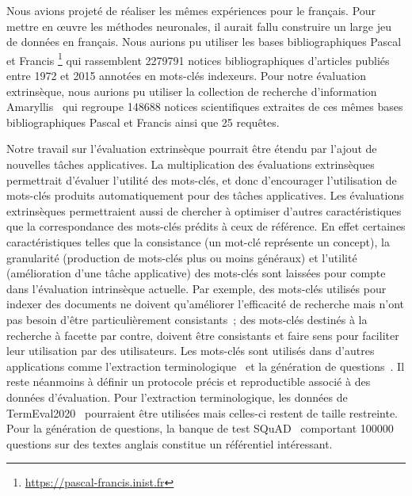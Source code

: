 Nous avions projeté de réaliser les mêmes expériences pour le français. Pour mettre en \oe{}uvre les méthodes neuronales, il aurait fallu construire un large jeu de données en français.
Nous aurions pu utiliser les bases bibliographiques Pascal et Francis \footnote{\url{https://pascal-francis.inist.fr}} qui rassemblent \num{2 279 791} notices bibliographiques d'articles publiés entre 1972 et 2015 annotées en mots-clés indexeurs.
Pour notre évaluation extrinsèque, nous aurions pu utiliser la collection de recherche d'information Amaryllis~\cite{peters_advances_2002} qui regroupe \num{148 688} notices scientifiques extraites de ces mêmes bases bibliographiques Pascal et Francis ainsi que 25 requêtes.



Notre travail sur l'évaluation extrinsèque pourrait être étendu par l'ajout de nouvelles tâches applicatives.
%
La multiplication des évaluations extrinsèques permettrait d'évaluer l'utilité des mots-clés, et donc d'encourager l'utilisation de mots-clés produits automatiquement pour des tâches applicatives.
Les évaluations extrinsèques permettraient aussi de chercher à optimiser d'autres caractéristiques que la correspondance des mots-clés prédits à ceux de référence.
En effet certaines caractéristiques telles que la consistance (un mot-clé représente un concept), la granularité (production de mots-clés plus ou moins généraux) et l'utilité (amélioration d'une tâche applicative) des mots-clés sont laissées pour compte dans l'évaluation intrinsèque actuelle.
Par exemple, des mots-clés utilisés pour indexer des documents ne doivent qu'améliorer l'efficacité de recherche mais n'ont pas besoin d'être particulièrement consistants~; des mots-clés destinés à la recherche à facette par contre, doivent être consistants et faire sens pour faciliter leur utilisation par des utilisateurs.
%
Les mots-clés sont utilisés dans d'autres applications comme l'extraction terminologique~\cite{lanza_terminology_2019} et la génération de questions~\cite{subramanian_neural_2018}. Il reste néanmoins à définir un protocole précis et reproductible associé à des données d'évaluation. Pour l'extraction terminologique, les données de TermEval2020~\cite{rigouts_terryn_termeval_2020} pourraient être utilisées mais celles-ci restent de taille restreinte. Pour la génération de questions, la banque de test SQuAD~\cite{rajpurkar_know_2018} comportant \num{100 000} questions sur des textes anglais constitue un référentiel intéressant.




